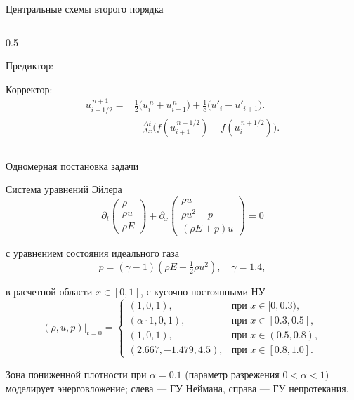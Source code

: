 \documentclass[ignoreonframetext,unicode,aspectratio=169]{beamer}
\begin{document}
\begin{frame}{Центральные схемы второго порядка}
\begin{columns}[t]
\begin{column}{0.5\textwidth}
\begin{block}{Предиктор:}
\[					\]
				\end{block}
				\vspace{-0.2 cm}
				\begin{block}{Корректор:}
					\[
					\begin{aligned}
						u_{i+1/2}^{\,n+1}=&\tfrac12\big(u_i^{\,n}+u_{i+1}^{\,n}\big)+\tfrac18\big(u'_i-u'_{i+1}\big).\\[-3pt]
						&-\frac{\Delta t}{\Delta x}\big(f(u_{i+1}^{\,n+1/2})-f(u_i^{\,n+1/2})\big).
					\end{aligned}
					\]
				\end{block}
			\end{column}
		\end{columns}
	\end{frame}

	\begin{frame}{Одномерная постановка задачи}

		\begin{block}{Система уравнений Эйлера}
			\[
			\partial_t \begin{pmatrix} \rho \\ \rho u \\ \rho E \end{pmatrix} +
			\partial_x \begin{pmatrix} \rho u \\ \rho u^2 + p \\ (\rho E + p)u \end{pmatrix} = 0
			\]

			с уравнением состояния идеального газа
			\vspace{-0.3 cm}
			\[
			p = (\gamma - 1)\left( \rho E - \tfrac{1}{2}\rho u^2 \right), \quad \gamma = 1.4,
			\]
		\end{block}
		в расчетной области $x \in [0, 1]$, с кусочно-постоянными НУ
		\vspace{-0.15 cm}
		\[
		(\rho, u, p)|_{t=0} =
		\begin{cases}
			(1, 0, 1), & \text{при } x \in [0, 0.3), \\
			(\alpha \cdot 1, 0, 1), & \text{при } x \in [0.3, 0.5], \\
			(1, 0, 1), & \text{при } x \in (0.5, 0.8), \\
			(2.667, -1.479, 4.5), & \text{при } x \in [0.8, 1.0].
		\end{cases}
		\]

		\vspace{-0.2 cm}
		Зона пониженной плотности при $\alpha = 0.1$ (параметр разрежения $0<\alpha< 1$) моделирует энерговложение; слева --- ГУ Неймана, справа --- ГУ непротекания.
	\end{frame}
\end{document}
